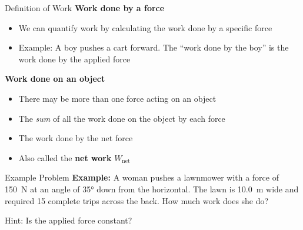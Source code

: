 \documentclass[12pt,compress,aspectratio=169]{beamer}
\begin{document}
\begin{frame}{Definition of Work}
  \textbf{Work done by a force}
  \begin{itemize}
  \item We can quantify work by calculating the work done by a specific force
  \item Example: A boy pushes a cart forward. The ``work done by the boy'' is
    the work done by the applied force
  \end{itemize}
  
  \vspace{.2in}\textbf{Work done on an object}
  \begin{itemize}
  \item There may be more than one force acting on an object
  \item The \emph{sum} of all the work done on the object by each force
  \item The work done by the net force
  \item Also called the \textbf{net work} $W_\text{net}$
  \end{itemize}
\end{frame}



\begin{frame}{Example Problem}
  \textbf{Example:} A woman pushes a lawnmower with a force of
  \SI{150}{\newton} at an angle of \ang{35} down from the horizontal. The lawn
  is \SI{10.0}{\metre} wide and required 15 complete trips across the back. How
  much work does she do?
  \begin{center}
  \end{center}
  Hint: Is the applied force constant?
\end{frame}



\end{document}
